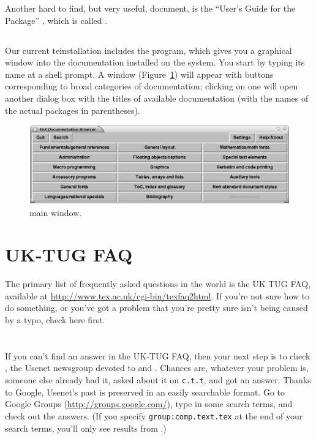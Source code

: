 Another hard to find, but very useful, document, is the ``User's Guide
for the  Package'' \citeyearpar{amsmath-doc}, which
is called .

\subsection{\protect{}}

Our current te\tex installation includes the  program,
which gives you a graphical window into the documentation installed on
the system.  You start  by typing its name at a shell
prompt.  A window (Figure~\ref{fig:texdoctk}) will appear with buttons
corresponding to broad categories of documentation; clicking on one
will open another dialog box with the titles of available
documentation (with the names of the actual packages in parentheses).

\begin{figure}[htbp]
  \centering
  \includegraphics[width=\textwidth-2cm,keepaspectratio=true]{texdoctk}
  \caption[\protect{} main window]{ main window.}
  \label{fig:texdoctk}
\end{figure}


\section{UK-TUG FAQ}

The primary list of frequently asked questions in the \tex world is
the UK TUG FAQ, available at
\url{http://www.tex.ac.uk/cgi-bin/texfaq2html}.  If you're not sure
how to do something, or you've got a problem that you're pretty sure
isn't being caused by a typo, check here first.


\section{\ctt}

If you can't find an answer in the UK-TUG FAQ, then your next step is
to check \ctt, the Usenet newsgroup devoted to \tex and \latex.
Chances are, whatever your problem is, someone else already had it,
asked about it on \texttt{c.t.t}, and got an answer.  Thanks to Google, Usenet's
past is preserved in an easily searchable format.  Go to Google Groups
(\url{http://groups.google.com/}), type in some search terms, and
check out the answers.  (If you specify \texttt{group:comp.text.tex}
at the end of your search terms, you'll only see results from \ctt.)


